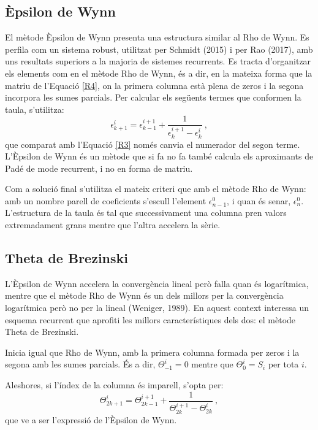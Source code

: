 \subsection{Èpsilon de Wynn}
El mètode Èpsilon de Wynn presenta una estructura similar al Rho de Wynn. Es perfila com un sistema robust, utilitzat per Schmidt (2015) i per Rao (2017), amb uns resultats superiors a la majoria de sistemes recurrents. Es tracta d'organitzar els elements com en el mètode Rho de Wynn, és a dir, en la mateixa forma que la matriu de l'Equació \ref{R4}, on la primera columna està plena de zeros i la segona incorpora les sumes parcials. Per calcular els següents termes que conformen la taula, s'utilitza:
\begin{equation}
    \epsilon^i_{k+1} = \epsilon^{i+1}_{k-1}+\frac{1}{\epsilon^{i+1}_k-\epsilon^{i}_k}\ ,
    \label{Reps}
\end{equation}
que comparat amb l'Equació \ref{R3} només canvia el numerador del segon terme. L'Èpsilon de Wynn és un mètode que si fa no fa també calcula els aproximants de Padé de mode recurrent, i no en forma de matriu.

Com a solució final s'utilitza el mateix criteri que amb el mètode Rho de Wynn: amb un nombre parell de coeficients s'escull l'element $\epsilon^0_{n-1}$, i quan és senar, $\epsilon^0_n$. L'estructura de la taula és tal que successivament una columna pren valors extremadament grans mentre que l'altra accelera la sèrie. 

\subsection{Theta de Brezinski}
L'Èpsilon de Wynn accelera la convergència lineal però falla quan és logarítmica, mentre que el mètode Rho de Wynn és un dels millors per la convergència logarítmica però no per la lineal (Weniger, 1989). En aquest context interessa un esquema recurrent que aprofiti les millors característiques dels dos: el mètode Theta de Brezinski. 

Inicia igual que Rho de Wynn, amb la primera columna formada per zeros i la segona amb les sumes parcials. 
És a dir, $\Theta^i_{-1}=0$ mentre que $\Theta^i_{0}=S_i$  per tota $i$. 

Aleshores, si l'índex de la columna és imparell, s'opta per:
\begin{equation}
\Theta^i_{2k+1}=\Theta^{i+1}_{2k-1}+\frac{1}{\Theta^{i+1}_{2k}-\Theta^{i}_{2k}}\ ,
\label{R5}
\end{equation}
que ve a ser l'expressió de l'Èpsilon de Wynn.

